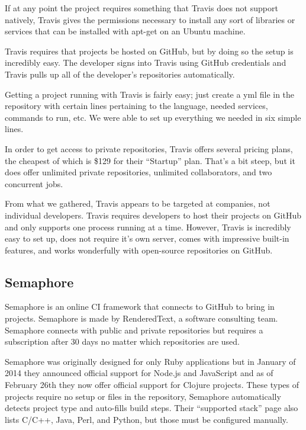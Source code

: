 \documentclass[12pt]{ucthesis}
\begin{document}
If at any point the project requires something that Travis does not support natively, Travis gives the permissions necessary to install any sort of libraries or services that can be installed with apt-get on an Ubuntu machine.

Travis requires that projects be hosted on GitHub, but by doing so the setup is incredibly easy. The developer signs into Travis using GitHub credentials and Travis pulls up all of the developer's repositories automatically. 

Getting a project running with Travis is fairly easy; just create a yml file in the repository with certain lines pertaining to the language, needed services, commands to run, etc. We were able to set up everything we needed in six simple lines.

In order to get access to private repositories, Travis offers several pricing plans, the cheapest of which is \$129\cite{TravisPricing} for their ``Startup'' plan. That's a bit steep, but it does offer unlimited private repositories, unlimited collaborators, and two concurrent jobs. 

From what we gathered, Travis appears to be targeted at companies, not individual developers. Travis requires developers to host their projects on GitHub and only supports one process running at a time. However, Travis is incredibly easy to set up, does not require it's own server, comes with impressive built-in features, and works wonderfully with open-source repositories on GitHub.

\subsection{Semaphore}
Semaphore\cite{Semaphore} is an online CI framework that connects to GitHub to bring in projects. Semaphore is made by RenderedText, a software consulting team. Semaphore connects with public and private repositories but requires a subscription after 30 days no matter which repositories are used.

Semaphore was originally designed for only Ruby applications but in January of 2014 they announced official support for Node.js and JavaScript and as of February 26th they now offer official support for Clojure projects\cite{SemaphoreBlog}. These types of projects require no setup or files in the repository, Semaphore automatically detects project type and auto-fills build steps. Their ``supported stack'' page also lists C/C++, Java, Perl, and Python, but those must be configured manually. 
\end{document}
